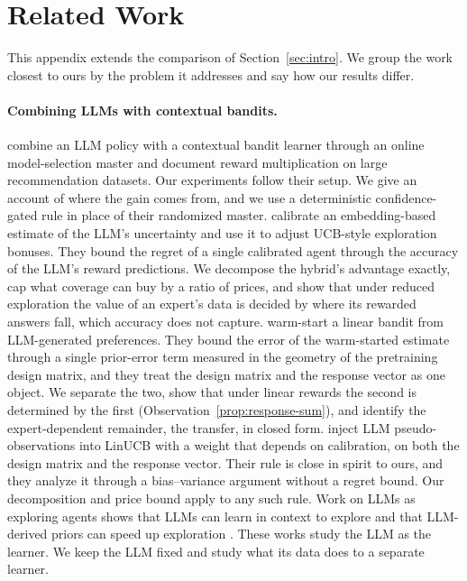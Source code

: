 \documentclass[anon]{alt2027} %
\newif\ifrevmarks\revmarkstrue
\newenvironment{revised}{\ifrevmarks\color{revcolor}\fi}{}
\begin{document}
\section{Related Work}\label{sec:related}
\begin{revised}
This appendix extends the comparison of Section~\ref{sec:intro}. We group
the work closest to ours by the problem it addresses and say how our results
differ.

\paragraph{Combining LLMs with contextual bandits.}
\citet{chen2024llmdecision} combine an LLM policy with a contextual bandit
learner through an online model-selection master and document reward
multiplication on large recommendation datasets. Our
experiments follow their setup. We give an account of where the gain comes
from, and we use a deterministic confidence-gated rule in place of their
randomized master. \citet{huangcontextual} calibrate an embedding-based
estimate of the LLM's uncertainty and use it to adjust UCB-style exploration
bonuses. They bound the regret of a single calibrated agent through the
accuracy of the LLM's reward predictions. We decompose the hybrid's
advantage exactly, cap what coverage can buy by a ratio of prices, and show
that under reduced exploration the value of an expert's data is decided by
where its rewarded answers fall, which accuracy does not capture.
\citet{jumpstart2026} warm-start a linear bandit from LLM-generated
preferences. They bound the error of the warm-started estimate through a
single prior-error term measured in the geometry of the pretraining design
matrix, and they treat the design matrix and the response vector as one
object. We separate the two, show that under linear rewards the second is
determined by the first (Observation~\ref{prop:response-sum}), and identify
the expert-dependent remainder, the transfer, in closed form.
\citet{calibgated2026} inject LLM pseudo-observations into LinUCB with a
weight that depends on calibration, on both the design matrix and the
response vector. Their rule is close in spirit to ours, and they analyze it
through a bias--variance argument without a regret bound. Our decomposition
and price bound apply to any such rule. Work on LLMs as exploring agents
shows that LLMs can learn in context to explore
\citep{monea2024llms,krishnamurthy2024can} and that LLM-derived priors can
speed up exploration \citep{alamdari2024jumpstarting,abbasiyadkori2024believe}.
These works study the LLM as the learner. We keep the LLM fixed and study
what its data does to a separate learner.


\end{revised}
\end{document}
